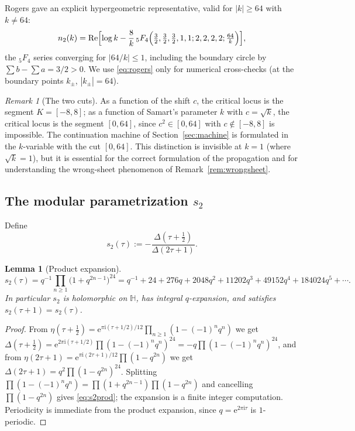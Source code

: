 \documentclass[11pt]{article}
\newtheorem{lemma}[theorem]{Lemma}
\theoremstyle{definition}
\theoremstyle{remark}
\newtheorem{remark}[theorem]{Remark}
\newcommand{\Hh}{\mathbb{H}}
\newcommand{\ii}{\mathrm{i}}
\newcommand{\e}{\mathrm{e}}
\newcommand{\ReT}{\operatorname{Re}}
\begin{document}
Rogers \cite{Ro} gave an explicit hypergeometric representative, valid
for $|k|\ge64$ with $k\neq64$:
\begin{equation}\label{eq:rogers}
  n_2(k)=\ReT\Bigl[\log k-\frac{8}{k}\,
  {}_5F_4\Bigl(\tfrac32,\tfrac32,\tfrac32,1,1;2,2,2,2;\tfrac{64}{k}\Bigr)\Bigr],
\end{equation}
the ${}_5F_4$ series converging for $|64/k|\le1$, including the
boundary circle by $\sum b-\sum a=3/2>0$. We use \eqref{eq:rogers}
only for numerical cross-checks (at the boundary points $k_\pm$,
$|k_\pm|=64$).

\begin{remark}[The two cuts]\label{rem:cuts}
As a function of the shift $c$, the critical locus is the segment $K=[-8,8]$;
as a function of Samart's parameter $k$ with $c=\sqrt{k}$, the critical locus
is the segment $[0,64]$, since $c^2\in[0,64]$ with $c\notin[-8,8]$ is
impossible. The continuation machine of Section~\ref{sec:machine} is
formulated in the $k$-variable with the cut $[0,64]$. This distinction is
invisible at $k=1$ (where $\sqrt{k}=1$), but it is essential for the
correct formulation of the propagation and for understanding the
wrong-sheet phenomenon of Remark~\ref{rem:wrongsheet}.
\end{remark}

\subsection{The modular parametrization \texorpdfstring{$s_2$}{s2}}\label{subsec:s2}

Define
\begin{equation}\label{eq:s2def}
  s_2(\tau):=-\frac{\Delta(\tau+\tfrac12)}{\Delta(2\tau+1)}.
\end{equation}

\begin{lemma}[Product expansion]\label{lem:s2prod}
\begin{equation}\label{eq:s2prod}
  s_2(\tau)=q^{-1}\prod_{n\ge1}\bigl(1+q^{2n-1}\bigr)^{24}
  =q^{-1}+24+276q+2048q^2+11202q^3+49152q^4+184024q^5+\cdots.
\end{equation}
In particular $s_2$ is holomorphic on $\Hh$, has integral $q$-expansion,
and satisfies $s_2(\tau+1)=s_2(\tau)$.
\end{lemma}
\begin{proof}
From $\eta(\tau+\tfrac12)=\e^{\pi \ii(\tau+1/2)/12}\prod_{n\ge1}(1-(-1)^nq^n)$
we get $\Delta(\tau+\tfrac12)=\e^{2\pi \ii(\tau+1/2)}\prod(1-(-1)^nq^n)^{24}
=-q\prod(1-(-1)^nq^n)^{24}$,
and from $\eta(2\tau+1)=\e^{\pi \ii(2\tau+1)/12}\prod(1-q^{2n})$ we get
$\Delta(2\tau+1)=q^2\prod(1-q^{2n})^{24}$.
Splitting $\prod(1-(-1)^nq^n)=\prod(1+q^{2n-1})\prod(1-q^{2n})$ and
cancelling $\prod(1-q^{2n})$ gives \eqref{eq:s2prod}; the expansion is a
finite integer computation. Periodicity is immediate from the product expansion, since
$q=\e^{2\pi\ii\tau}$ is $1$-periodic.
\end{proof}
\end{document}
